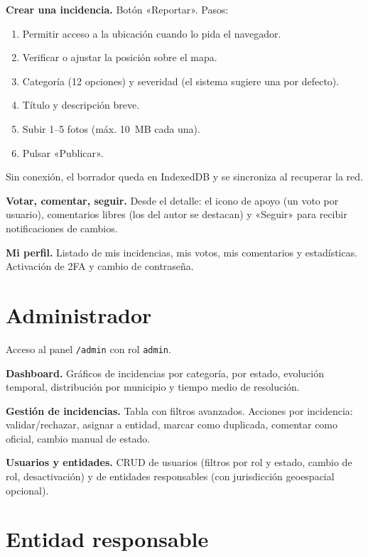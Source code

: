 \textbf{Crear una incidencia.}  Botón «Reportar». Pasos:

\begin{enumerate}[leftmargin=1.2cm, itemsep=2pt]
  \item Permitir acceso a la ubicación cuando lo pida el navegador.
  \item Verificar o ajustar la posición sobre el mapa.
  \item Categoría (12 opciones) y severidad (el sistema sugiere una por defecto).
  \item Título y descripción breve.
  \item Subir 1--5 fotos (máx. 10~MB cada una).
  \item Pulsar «Publicar».
\end{enumerate}

Sin conexión, el borrador queda en IndexedDB y se sincroniza al recuperar la red.

\textbf{Votar, comentar, seguir.}  Desde el detalle: el icono de apoyo (un voto por usuario), comentarios libres (los del autor se destacan) y «Seguir» para recibir notificaciones de cambios.

\textbf{Mi perfil.}  Listado de mis incidencias, mis votos, mis comentarios y estadísticas. Activación de 2FA y cambio de contraseña.


\section{Administrador}
\label{sec:manual-admin}

Acceso al panel \texttt{/admin} con rol \texttt{admin}.

\textbf{Dashboard.}  Gráficos de incidencias por categoría, por estado, evolución temporal, distribución por municipio y tiempo medio de resolución.

\textbf{Gestión de incidencias.}  Tabla con filtros avanzados. Acciones por incidencia: validar/rechazar, asignar a entidad, marcar como duplicada, comentar como oficial, cambio manual de estado.

\textbf{Usuarios y entidades.}  CRUD de usuarios (filtros por rol y estado, cambio de rol, desactivación) y de entidades responsables (con jurisdicción geoespacial opcional).


\section{Entidad responsable}
\label{sec:manual-entidad}

